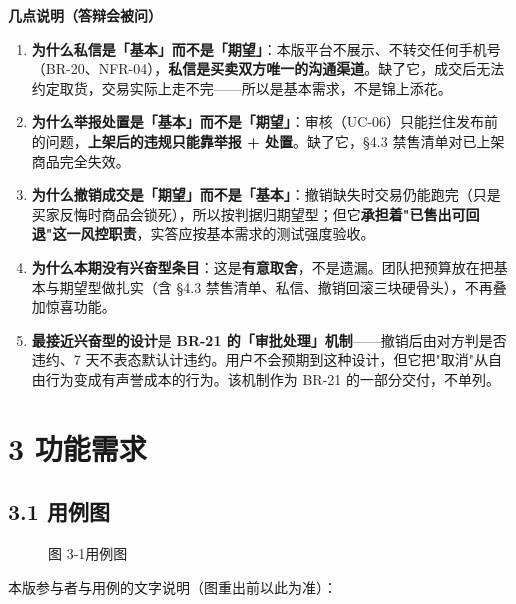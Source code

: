 \documentclass[12pt,a4paper]{ctexart}
\begin{document}
\textbf{几点说明（答辩会被问）}


\begin{enumerate}[leftmargin=1.9em,itemsep=1pt,topsep=2pt]
\item \textbf{为什么私信是「基本」而不是「期望」}：本版平台不展示、不转交任何手机号（BR-20、NFR-04），\textbf{私信是买卖双方唯一的沟通渠道}。缺了它，成交后无法约定取货，交易实际上走不完——所以是基本需求，不是锦上添花。
\item \textbf{为什么举报处置是「基本」而不是「期望」}：审核（UC-06）只能拦住发布前的问题，\textbf{上架后的违规只能靠举报 + 处置}。缺了它，§4.3 禁售清单对已上架商品完全失效。
\item \textbf{为什么撤销成交是「期望」而不是「基本」}：撤销缺失时交易仍能跑完（只是买家反悔时商品会锁死），所以按判据归期望型；但它\textbf{承担着"已售出可回退"这一风控职责}，实答应按基本需求的测试强度验收。
\item \textbf{为什么本期没有兴奋型条目}：这是\textbf{有意取舍}，不是遗漏。团队把预算放在把基本与期望型做扎实（含 §4.3 禁售清单、私信、撤销回滚三块硬骨头），不再叠加惊喜功能。
\item \textbf{最接近兴奋型的设计}是 \textbf{BR-21 的「审批处理」机制}——撤销后由对方判是否违约、7 天不表态默认计违约。用户不会预期到这种设计，但它把"取消"从自由行为变成有声誉成本的行为。该机制作为 BR-21 的一部分交付，不单列。
\end{enumerate}



\section*{3 功能需求}

\subsection*{3.1 用例图}
\begin{figure}[htbp]
\centering
{}
\caption*{图 3-1\quad 用例图}
\label{fig:usecase}
\end{figure}


本版参与者与用例的文字说明（图重出前以此为准）：
\end{document}
